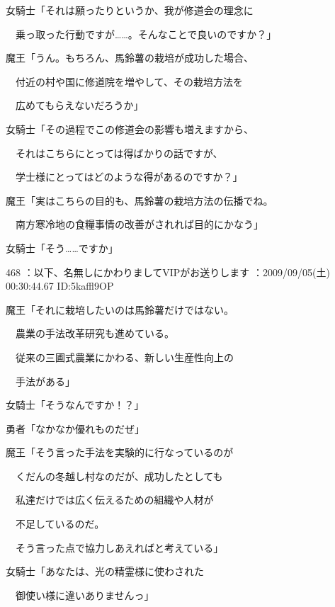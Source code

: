 \documentclass[a4j,twocolumn]{tarticle}
\begin{document}
女騎士「それは願ったりというか、我が修道会の理念に\par{} 
　乗っ取った行動ですが……。そんなことで良いのですか？」 



魔王「うん。もちろん、馬鈴薯の栽培が成功した場合、\par{} 
　付近の村や国に修道院を増やして、その栽培方法を\par{} 
　広めてもらえないだろうか」 



女騎士「その過程でこの修道会の影響も増えますから、\par{} 
　それはこちらにとっては得ばかりの話ですが、\par{} 
　学士様にとってはどのような得があるのですか？」 



魔王「実はこちらの目的も、馬鈴薯の栽培方法の伝播でね。\par{} 
　南方寒冷地の食糧事情の改善がされれば目的にかなう」 



女騎士「そう……ですか」 

	
    
    

468 ：以下、名無しにかわりましてVIPがお送りします ：2009/09/05(土) 00:30:44.67 ID:5kaffl9OP 


魔王「それに栽培したいのは馬鈴薯だけではない。\par{} 
　農業の手法改革研究も進めている。\par{} 
　従来の三圃式農業にかわる、新しい生産性向上の\par{} 
　手法がある」 



女騎士「そうなんですか！？」 



勇者「なかなか優れものだぜ」 



魔王「そう言った手法を実験的に行なっているのが\par{} 
　くだんの冬越し村なのだが、成功したとしても\par{} 
　私達だけでは広く伝えるための組織や人材が\par{} 
　不足しているのだ。\par{} 
　そう言った点で協力しあえればと考えている」 



女騎士「あなたは、光の精霊様に使わされた\par{} 
　御使い様に違いありませんっ」 
\end{document}
